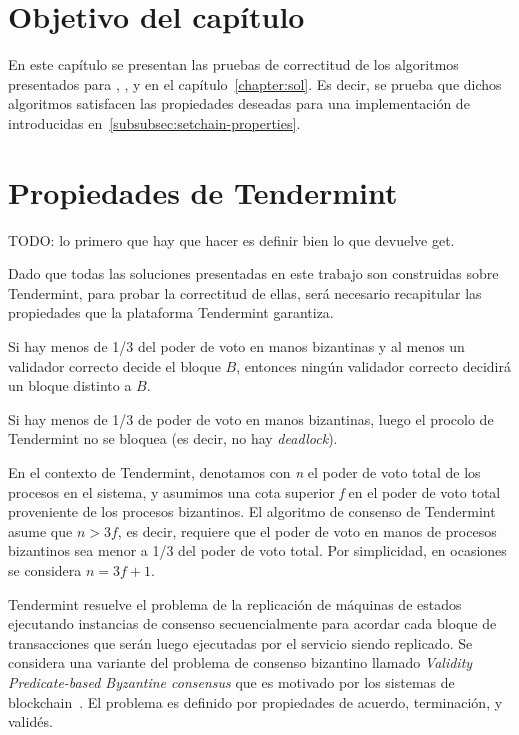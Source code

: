 \section{Objetivo del capítulo}
En este capítulo se presentan las pruebas de correctitud de los algoritmos presentados para
\vanilla, \compresschain, y \hashchain en el capítulo~\ref{chapter:sol}.
Es decir, se prueba que dichos algoritmos satisfacen las propiedades deseadas para una
implementación de \setchain introducidas en~\ref{subsubsec:setchain-properties}.

\section{Propiedades de Tendermint}\label{sec:properties}
TODO: lo primero que hay que hacer es definir bien lo que devuelve get.

Dado que todas las soluciones presentadas en este trabajo son construidas sobre Tendermint,
para probar la correctitud de ellas, será necesario recapitular las propiedades que la
plataforma Tendermint garantiza.

\setcounter{prop:tendermint}{\value{property}}

\begin{property}[Safety]\label{tendermint:safety}
  Si hay menos de 1/3 del poder de voto en manos bizantinas y al menos un validador correcto
  decide el bloque $B$, entonces ningún validador correcto decidirá un bloque distinto a $B$.
\end{property}

\begin{property}[Liveness]\label{tendermint:liveness}
  Si hay menos de 1/3 de poder de voto en manos bizantinas, luego el procolo de Tendermint
  no se bloquea (es decir, no hay \textit{deadlock}).
\end{property}

En el contexto de Tendermint, denotamos con \textit{n} el poder de voto total de los procesos
en el sistema, y asumimos una cota superior \textit{f} en el poder de voto total proveniente de
los procesos bizantinos.
%
El algoritmo de consenso de Tendermint asume que $n > 3f$, es decir, requiere que el poder de voto
en manos de procesos bizantinos sea menor a 1/3 del poder de voto total.
Por simplicidad, en ocasiones se considera $n = 3f + 1$.

Tendermint resuelve el problema de la replicación de máquinas de estados ejecutando instancias de
consenso secuencialmente para acordar cada bloque de transacciones que serán luego ejecutadas por el
servicio siendo replicado.
Se considera una variante del problema de consenso bizantino llamado \textit{Validity Predicate-based Byzantine consensus}
que es motivado por los sistemas de blockchain~\cite{Crain2017LeaderRandomizationSignaturefreeBC}.
El problema es definido por propiedades de acuerdo, terminación, y validés.

